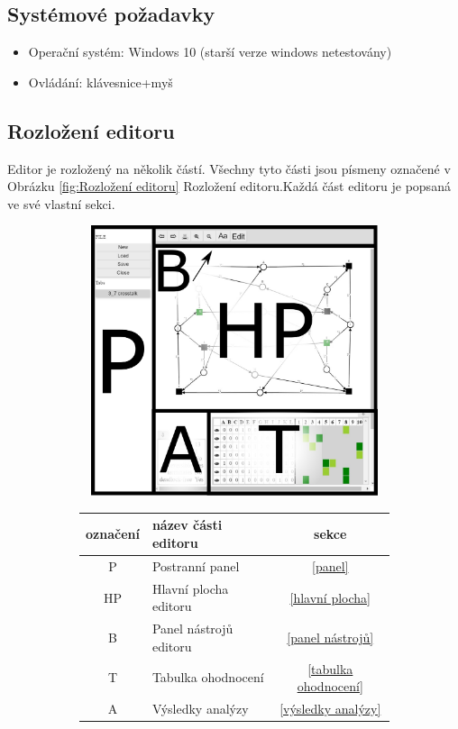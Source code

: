 \documentclass[
  biblatex,
  glossaries,
  index
]{kidiplom}
\begin{document}
\subsection{Systémové požadavky}
\begin{itemize}
  \item Operační systém: Windows 10 (starší verze windows netestovány)
  \item Ovládání: klávesnice+myš
\end{itemize}

  
\subsection{Rozložení editoru}
Editor je rozložený na několik částí. Všechny tyto části 
jsou písmeny označené v Obrázku \ref{fig:Rozložení editoru} 
Rozložení editoru.Každá část editoru je popsaná ve své vlastní sekci.
\begin{center}

\end{center}
  
\begin{figure}[t!]
  \centering
  \begin{subfigure}[h]{350px}
    \includegraphics[height=300px, width=350px]{full_image_splited}
  \end{subfigure}
  \caption{Rozložení editoru}
  \label{fig:Rozložení editoru}
  \begin{subfigure}[h]{0.55\textwidth}
    \begin{tabular}{|c l c|}
      \hline
      označení &      název části editoru &    sekce \\
      \hline
      \hline
      P &             Postranní panel&  \ref{panel} \\
      HP &            Hlavní plocha editoru&  \ref{hlavní plocha} \\
      B &             Panel nástrojů editoru &  \ref{panel nástrojů} \\
      T &             Tabulka ohodnocení &  \ref{tabulka ohodnocení} \\
      A &             Výsledky analýzy &  \ref{výsledky analýzy} \\
      \hline
    \end{tabular}
  \end{subfigure}
\end{figure}
\end{document}
